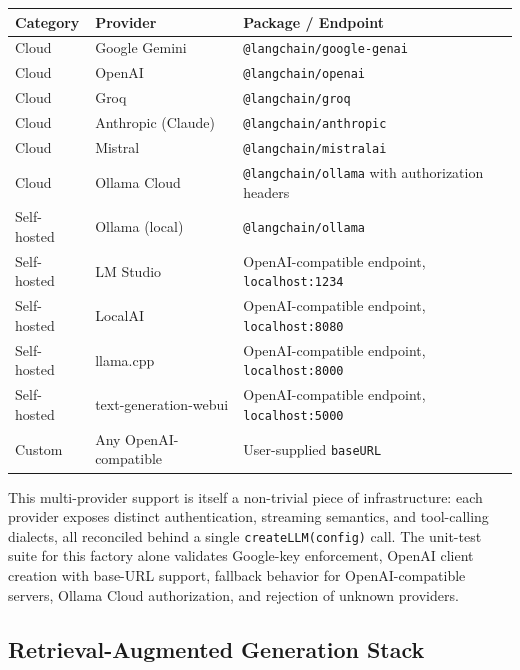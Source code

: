 \documentclass[11pt,a4paper]{report}
\newcommand{\code}[1]{\texttt{\small #1}}
\begin{document}
\begin{longtable}{@{}L{2.3cm} L{4.8cm} L{6.6cm}@{}}
\toprule
\textbf{Category} & \textbf{Provider} & \textbf{Package / Endpoint}\\
\midrule\endhead
Cloud        & Google Gemini         & \code{@langchain/google-genai}\\
Cloud        & OpenAI                & \code{@langchain/openai}\\
Cloud        & Groq                  & \code{@langchain/groq}\\
Cloud        & Anthropic (Claude)    & \code{@langchain/anthropic}\\
Cloud        & Mistral               & \code{@langchain/mistralai}\\
Cloud        & Ollama Cloud          & \code{@langchain/ollama} with authorization headers\\
Self-hosted  & Ollama (local)        & \code{@langchain/ollama}\\
Self-hosted  & LM Studio             & OpenAI-compatible endpoint, \code{localhost:1234}\\
Self-hosted  & LocalAI               & OpenAI-compatible endpoint, \code{localhost:8080}\\
Self-hosted  & llama.cpp             & OpenAI-compatible endpoint, \code{localhost:8000}\\
Self-hosted  & text-generation-webui & OpenAI-compatible endpoint, \code{localhost:5000}\\
Custom       & Any OpenAI-compatible & User-supplied \code{baseURL}\\
\bottomrule
\end{longtable}

This multi-provider support is itself a non-trivial piece of infrastructure:
each provider exposes distinct authentication, streaming semantics, and
tool-calling dialects, all reconciled behind a single \code{createLLM(config)}
call. The unit-test suite for this factory alone validates Google-key
enforcement, OpenAI client creation with base-URL support, fallback behavior
for OpenAI-compatible servers, Ollama Cloud authorization, and rejection of
unknown providers.

\subsection{Retrieval-Augmented Generation Stack}
\end{document}

